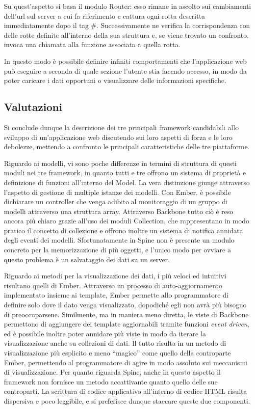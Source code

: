 Su quest'aspetto si basa il modulo Router: esso rimane in ascolto sui cambiamenti dell'url sul server a cui fa riferimento e cattura ogni rotta descritta immediatamente dopo il tag \#. Successivamente ne verifica la corrispondenza con delle rotte definite all'interno della sua struttura e, se viene trovato un confronto, invoca una chiamata alla funzione associata a quella rotta.

In questo modo è possibile definire infiniti comportamenti che l'applicazione web può eseguire a seconda di quale sezione l'utente stia facendo accesso, in modo da poter caricare i dati opportuni o visualizzare delle informazioni specifiche.


\subsection{Valutazioni} %
\label{sub:valutazioni}

Si conclude dunque la descrizione dei tre principali framework candidabili allo sviluppo di un'applicazione web discutendo sui loro aspetti di forza e le loro debolezze, mettendo a confronto le principali caratteristiche delle tre piattaforme.

Riguardo ai modelli, vi sono poche differenze in termini di struttura di questi moduli nei tre framework, in quanto tutti e tre offrono un sistema di proprietà e definizione di funzioni all'interno del Model.
La vera distinzione giunge attraverso l'aspetto di gestione di multiple istanze dei modelli. Con Ember, è possibile dichiarare un controller che venga adibito al monitoraggio di un gruppo di modelli attraverso una struttura array. Attraverso Backbone tutto ciò è reso ancora più chiaro grazie all'uso dei moduli Collection, che rappresentano in modo pratico il concetto di collezione e offrono inoltre un sistema di notifica annidata degli eventi dei modelli. Sfortunatamente in Spine non è presente un modulo concreto per la memorizzazione di più oggetti, e l'unico modo per ovviare a questo problema è un salvataggio dei dati su un server.

Riguardo ai metodi per la visualizzazione dei dati, i più veloci ed intuitivi risultano quelli di Ember. Attraverso un processo di auto-aggiornamento implementato insieme ai template, Ember permette allo programmatore di definire solo dove il dato venga visualizzato, dopodiché egli non avrà più bisogno di preoccuparsene. Similmente, ma in maniera meno diretta, le viste di Backbone permettono di aggiungere dei template aggiornabili tramite funzioni {\itshape event driven}, ed è possibile inoltre poter annidare più viste in modo da iterare la visualizzazione anche su collezioni di dati. Il tutto risulta in un metodo di visualizzazione più esplicito e meno ``magico'' come quello della controparte Ember, permettendo al programmatore di agire in modo assoluto sui meccanismi di visualizzazione. Per quanto riguarda Spine, anche in questo aspetto il framework non fornisce un metodo accattivante quanto quello delle sue controparti. La scrittura di codice applicativo all'interno di codice HTML risulta dispersiva e poco leggibile, e si preferisce dunque staccare queste due componenti.

